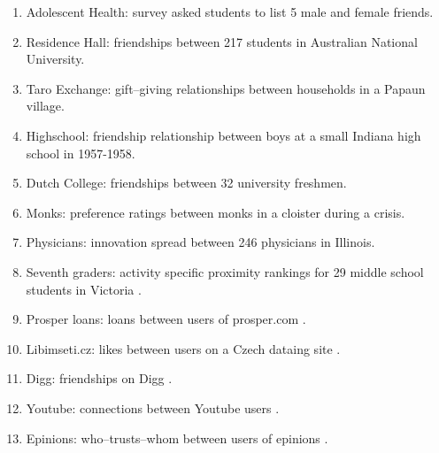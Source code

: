 \documentclass[3p,times]{elsarticle}
\begin{document}
\begin{enumerate}


    	
    	\item Adolescent Health: survey asked students to list 5 male and female friends. \cite{AdHealth}
    	
    	\item Residence Hall: friendships between 217 students in Australian National University. \cite{Res}
    	
    	\item Taro Exchange: gift--giving relationships between households in a Papaun village. \cite{Taro}
    	
    	\item Highschool: friendship relationship between boys at a small Indiana high school in 1957-1958. \cite{HS}
    	
    	\item Dutch College: friendships between 32 university freshmen. \cite{Dutch}
    	
    	\item Monks: preference ratings between monks in a cloister during a crisis. \cite{monks}
    	
    	\item Physicians: innovation spread between 246 physicians in Illinois. \cite{docs}
    	
    	\item Seventh graders: activity specific proximity rankings for 29 middle school students in Victoria \cite{sevies}.
    
    \item Prosper loans: loans between users of prosper.com \cite{prosper}.
    
    \item Libimseti.cz: likes between users on a Czech dataing site \cite{libi}.
    
    
    \item Digg: friendships on Digg \cite{digg}.
    
    \item Youtube: connections between Youtube users \cite{youtube}.
    
    \item Epinions: who--trusts--whom between users of epinions \cite{epinions}.
  

\end{enumerate}
\end{document}
